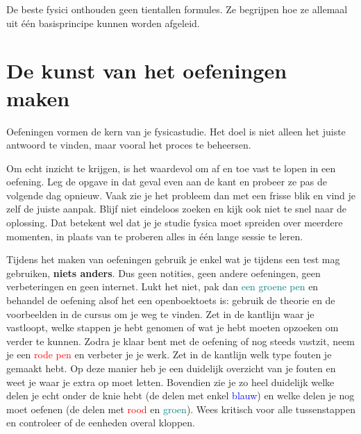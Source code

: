\documentclass{ximera}
\begin{document}
\begin{remark}
De beste fysici onthouden geen tientallen formules. Ze begrijpen hoe ze allemaal uit één basisprincipe kunnen worden afgeleid.
\end{remark}


\section*{De kunst van het oefeningen maken}

Oefeningen vormen de kern van je fysicastudie.
Het doel is niet alleen het juiste antwoord te vinden, maar vooral het proces te beheersen.

Om echt inzicht te krijgen, is het waardevol om af en toe vast te lopen in een oefening.
Leg de opgave in dat geval even aan de kant en probeer ze pas de volgende dag opnieuw.
Vaak zie je het probleem dan met een frisse blik en vind je zelf de juiste aanpak.
Blijf niet eindeloos zoeken en kijk ook niet te snel naar de oplossing.
Dat betekent wel dat je je studie fysica moet spreiden over meerdere momenten,
in plaats van te proberen alles in één lange sessie te leren.

Tijdens het maken van oefeningen gebruik je enkel wat je tijdens een test mag gebruiken, \textbf{niets anders}.
Dus geen notities, geen andere oefeningen, geen verbeteringen en geen internet.
\newline
Lukt het niet, pak dan \textcolor{teal}{een groene pen} en behandel de oefening alsof het een openboektoets is: gebruik de theorie en de voorbeelden in de cursus om je weg te vinden.
Zet in de kantlijn waar je vastloopt, welke stappen je hebt genomen of wat je hebt moeten opzoeken om verder te kunnen.
\newline
Zodra je klaar bent met de oefening of nog steeds vastzit, neem je een \textcolor{red}{rode pen} en verbeter je je werk. Zet in de kantlijn welk type fouten je gemaakt hebt.
Op deze manier heb je een duidelijk overzicht van je fouten en weet je waar je extra op moet letten.
Bovendien zie je zo heel duidelijk welke delen je echt onder de knie hebt (de delen met enkel \textcolor{blue}{blauw}) en welke delen je nog moet oefenen (de delen met \textcolor{red}{rood} en \textcolor{teal}{groen}).
Wees kritisch voor alle tussenstappen en controleer of de eenheden overal kloppen.
\end{document}

